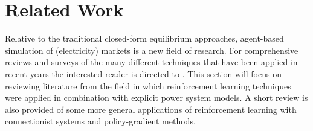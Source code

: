 \chapter{Related Work}
\label{ch:related_work}
\label{sec:related}
Relative to the traditional closed-form equilibrium approaches, agent-based
simulation of (electricity) markets is a new field of research.  For
comprehensive reviews and surveys of the many different techniques that have
been applied in recent years the interested reader is directed to
\cite{anke:2008,tesfatsi:handbook,visud:thesis}.  This section will focus on
reviewing literature from the field in which reinforcement learning techniques
were applied in combination with explicit power system models.  A short review
is also provided of some more general applications of reinforcement learning
with connectionist systems and policy-gradient methods.

%
%

